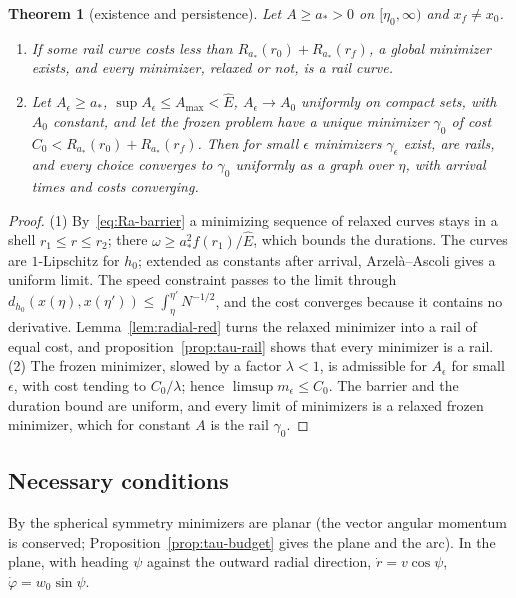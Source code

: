 \documentclass[aip,jmp,amsmath,amssymb,reprint]{revtex4-2}
\newcommand{\Ehat}{\hat E}
\theoremstyle{plain}
\newtheorem{theorem}{Theorem}
\theoremstyle{definition}
\begin{document}
\begin{theorem}[existence and persistence]\label{thm:tau-exist}
Let $A\ge a_*>0$ on $[\eta_0,\infty)$ and $x_f\neq x_0$.
\begin{enumerate}
\item If some rail curve costs less than $R_{a_*}(r_0)+R_{a_*}(r_f)$, a global minimizer exists,
  and every minimizer, relaxed or not, is a rail curve.
\item Let $A_\epsilon\ge a_*$, $\sup A_\epsilon\le A_{\max}<\Ehat$, $A_\epsilon\to A_0$ uniformly on
  compact sets, with $A_0$ constant, and let the frozen problem have a unique minimizer
  $\gamma_0$ of cost $C_0<R_{a_*}(r_0)+R_{a_*}(r_f)$. Then for small $\epsilon$ minimizers
  $\gamma_\epsilon$ exist, are rails, and every choice converges to $\gamma_0$ uniformly as a graph
  over $\eta$, with arrival times and costs converging.
\end{enumerate}
\end{theorem}

\begin{proof}
(1) By~\eqref{eq:Ra-barrier} a minimizing sequence of relaxed curves stays in a shell
$r_1\le r\le r_2$; there $\omega\ge a_*^2f(r_1)/\Ehat$, which bounds the durations. The curves
are $1$-Lipschitz for $h_0$; extended as constants after arrival, Arzel\`a--Ascoli gives a
uniform limit. The speed constraint passes to the limit through
$d_{h_0}(x(\eta),x(\eta'))\le\int_\eta^{\eta'}N^{-1/2}$, and the cost converges because it
contains no derivative. Lemma~\ref{lem:radial-red} turns the relaxed minimizer into a rail of
equal cost, and proposition~\ref{prop:tau-rail} shows that every minimizer is a rail.
(2) The frozen minimizer, slowed by a factor $\lambda<1$, is admissible for $A_\epsilon$ for
small $\epsilon$, with cost tending to $C_0/\lambda$; hence $\limsup m_\epsilon\le C_0$. The barrier
and the duration bound are uniform, and every limit of minimizers is a relaxed frozen
minimizer, which for constant $A$ is the rail $\gamma_0$.
\end{proof}

\subsection{Necessary conditions}
By the spherical symmetry minimizers are planar (the vector angular momentum is conserved;
Proposition~\ref{prop:tau-budget} gives the plane and the arc).
In the plane, with heading $\psi$ against the outward radial direction, $\dot r=v\cos\psi$,
$\dot\varphi=w_0\sin\psi$.
\end{document}
